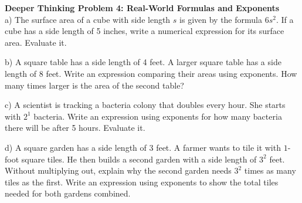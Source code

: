 \documentclass[12pt, letterpaper, fleqn]{article}
\begin{document}
\begin{tcolorbox}[colback=white, colframe=black, boxrule=1pt, arc=4mm, left=6mm, right=6mm, top=5mm, bottom=5mm]
\textbf{Deeper Thinking Problem 4: Real-World Formulas and Exponents}
\medskip
\noindent \\
a) The surface area of a cube with side length $s$ is given by the formula $6s^2$. If a cube has a side length of 5 inches, write a numerical expression for its surface area. Evaluate it.
\vspace{2.5cm}

\noindent
b) A square table has a side length of 4 feet. A larger square table has a side length of 8 feet. Write an expression comparing their areas using exponents. How many times larger is the area of the second table?
\vspace{3cm}

\noindent
c) A scientist is tracking a bacteria colony that doubles every hour. She starts with $2^1$ bacteria. Write an expression using exponents for how many bacteria there will be after 5 hours. Evaluate it.
\vspace{3cm}

\noindent
d) A square garden has a side length of 3 feet. A farmer wants to tile it with $1$-foot square tiles. He then builds a second garden with a side length of $3^2$ feet. Without multiplying out, explain why the second garden needs $3^2$ times as many tiles as the first. Write an expression using exponents to show the total tiles needed for both gardens combined.
\vspace{3cm}
\end{tcolorbox}
\end{document}
